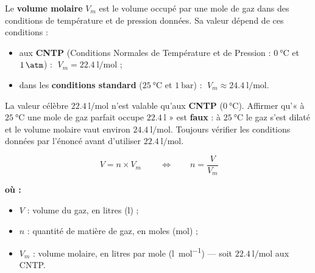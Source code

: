 \documentclass[11pt,a4paper]{article}
\newenvironment{ou}{%
  \par\smallskip\noindent\textbf{où :}\nopagebreak
  \begin{itemize}[leftmargin=1.8em,topsep=2pt,itemsep=1.5pt,parsep=0pt]}%
  {\end{itemize}}
\begin{document}
\begin{definition}
Le \textbf{volume molaire} $V_m$ est le volume occupé par une mole de gaz dans des conditions de
température et de pression données. Sa valeur dépend de ces conditions :
\begin{itemize}[leftmargin=1.6em,topsep=2pt,itemsep=2pt]
  \item aux \textbf{CNTP} (Conditions Normales de Température et de Pression : $\SI{0}{\celsius}$ et
        $\SI{1}{\atm}$) : $\;V_m = \SI{22.4}{\litre\per\mole}$ ;
  \item dans les \textbf{conditions standard} ($\SI{25}{\celsius}$ et $\SI{1}{\bar}$) :
        $\;V_m \approx \SI{24.4}{\litre\per\mole}$.
\end{itemize}
\end{definition}

\begin{attention}
La valeur célèbre $\SI{22.4}{\litre\per\mole}$ n'est valable qu'aux \textbf{CNTP}
($\SI{0}{\celsius}$). Affirmer qu'« à $\SI{25}{\celsius}$ une mole de gaz parfait occupe
$\SI{22.4}{\litre}$ » est \textbf{faux} : à $\SI{25}{\celsius}$ le gaz s'est dilaté et le volume
molaire vaut environ $\SI{24.4}{\litre\per\mole}$. Toujours vérifier les conditions données par
l'énoncé avant d'utiliser $\SI{22.4}{\litre\per\mole}$.
\end{attention}

\begin{formule}
\[ \boxed{\,V = n\times V_m\,}\qquad\Longleftrightarrow\qquad n = \dfrac{V}{V_m} \]
\begin{ou}
  \item $V$ : volume du gaz, en litres (\si{\litre}) ;
  \item $n$ : quantité de matière de gaz, en moles (\si{\mole}) ;
  \item $V_m$ : volume molaire, en litres par mole (\si{\litre\per\mole}) — soit $\SI{22.4}{\litre\per\mole}$ aux CNTP.
\end{ou}
\end{formule}
\end{document}
